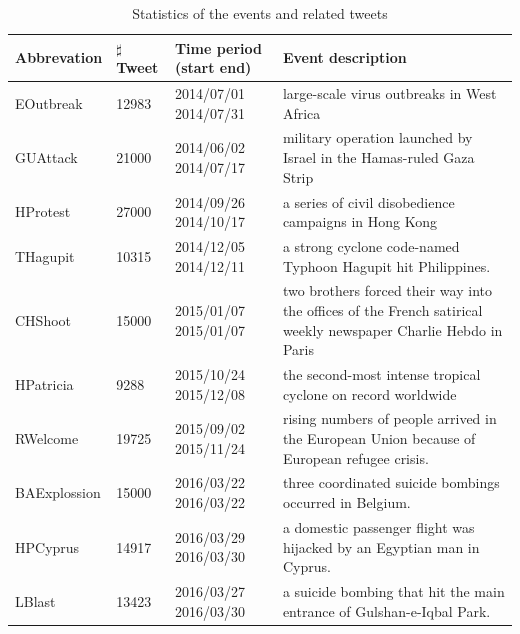 \documentclass[runningheads]{llncs}
\begin{document}
\begin{table}[ht]
\caption{Statistics of the events and related tweets}\label{table:static}
\begin{center}
\tiny
\begin{tabular}{|p{1.5cm}|p{0.9cm}|p{1.3cm}|p{6cm}|}
    \hline
    Abbrevation & $\sharp$ Tweet & Time period (start end) &  Event description\\
    \hline
    EOutbreak & 12983 & 2014/07/01  2014/07/31 &  large-scale virus outbreaks in West Africa \\
    \hline
    GUAttack & 21000 & 2014/06/02  2014/07/17 &military operation launched by Israel in the Hamas-ruled Gaza Strip \\
    \hline
    HProtest & 27000 & 2014/09/26  2014/10/17 & a series of civil disobedience campaigns  in Hong Kong \\
    \hline
    THagupit & 10315 & 2014/12/05  2014/12/11 & a strong cyclone code-named Typhoon Hagupit hit Philippines. \\
    \hline
    CHShoot & 15000 & 2015/01/07  2015/01/07 &two brothers forced their way into the offices of the French satirical weekly newspaper Charlie Hebdo in Paris \\
    \hline
    HPatricia & 9288 & 2015/10/24  2015/12/08 &  the second-most intense tropical cyclone on record worldwide \\
    \hline
    RWelcome & 19725 & 2015/09/02  2015/11/24 & rising numbers of people arrived in the European Union because of European refugee crisis.\\
    \hline
    BAExplossion & 15000 & 2016/03/22  2016/03/22 &three coordinated suicide bombings occurred in Belgium.\\
    \hline
    HPCyprus & 14917 & 2016/03/29 2016/03/30 & a domestic passenger flight was hijacked by an Egyptian man in Cyprus.\\
    \hline
    LBlast & 13423 & 2016/03/27  2016/03/30 & a suicide bombing that hit the main entrance of Gulshan-e-Iqbal Park.\\
    \hline
\end{tabular}
\end{center}
\label{default}
\end{table}
\end{document}
